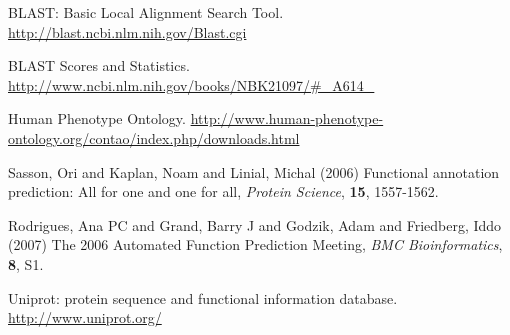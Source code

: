 \documentclass{bioinfo}
\begin{document}
\begin{thebibliography}{}

 BLAST: Basic Local Alignment Search Tool. \href{http://blast.ncbi.nlm.nih.gov/Blast.cgi}{http://blast.ncbi.nlm.nih.gov/Blast.cgi}

 BLAST Scores and Statistics. \href{http://www.ncbi.nlm.nih.gov/books/NBK21097/\#\_A614\_}{http://www.ncbi.nlm.nih.gov/books/NBK21097/\#\_A614\_}

 Human Phenotype Ontology. \href{http://www.human-phenotype-ontology.org/contao/index.php/downloads.html}{http://www.human-phenotype-ontology.org/contao/index.php/downloads.html}

 Sasson, Ori and Kaplan, Noam and Linial, Michal (2006) Functional annotation prediction: All for one and one for all, {\it Protein Science}, {\bf 15}, 1557-1562.

 Rodrigues, Ana PC and Grand, Barry J and Godzik, Adam and Friedberg, Iddo (2007) The 2006 Automated Function Prediction Meeting, {\it BMC Bioinformatics}, {\bf 8}, S1. %

 Uniprot: protein sequence and functional information database. \href{http://www.uniprot.org/}{http://www.uniprot.org/}


\end{thebibliography}
\end{document}

